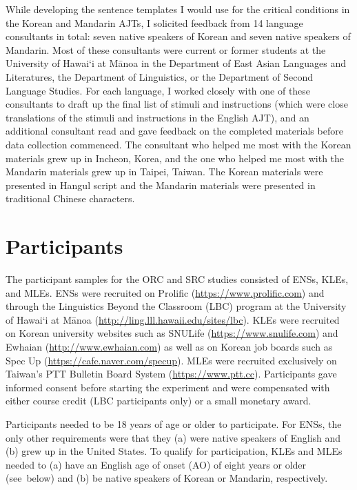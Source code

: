 While developing the sentence templates I would use for the critical conditions in the Korean and Mandarin AJTs, I solicited feedback from 14 language consultants in total: seven native speakers of Korean and seven native speakers of Mandarin. Most of these consultants were current or former students at the University of Hawai`i at Mānoa in the Department of East Asian Languages and Literatures, the Department of Linguistics, or the Department of Second Language Studies. For each language, I worked closely with one of these consultants to draft up the final list of stimuli and instructions (which were close translations of the stimuli and instructions in the English AJT), and an additional consultant read and gave feedback on the completed materials before data collection commenced. The consultant who helped me most with the Korean materials grew up in Incheon, Korea, and the one who helped me most with the Mandarin materials grew up in Taipei, Taiwan. The Korean materials were presented in Hangul script and the Mandarin materials were presented in traditional Chinese characters.

\section{Participants}\label{stu-participant}

The participant samples for the ORC and SRC studies consisted of ENSs, KLEs, and MLEs. ENSs were recruited on Prolific (\url{https://www.prolific.com}) and through the Linguistics Beyond the Classroom (LBC) program at the University of Hawai`i at Mānoa (\url{http://ling.lll.hawaii.edu/sites/lbc}). KLEs were recruited on Korean university websites such as SNULife (\url{https://www.snulife.com}) and Ewhaian (\url{http://www.ewhaian.com}) as well as on Korean job boards such as Spec Up (\url{https://cafe.naver.com/specup}). MLEs were recruited exclusively on Taiwan's PTT Bulletin Board System (\url{https://www.ptt.cc}).\footnotemark{} Participants gave informed consent before starting the experiment and were compensated with either course credit (LBC participants only) or a small monetary award.


Participants needed to be 18 years of age or older to participate. For ENSs, the only other requirements were that they (a) were native speakers of English and (b) grew up in the United States. To qualify for participation, KLEs and MLEs needed to (a) have an English age of onset (AO) of eight years or older (see~below) and (b) be native speakers of Korean or Mandarin, respectively.


